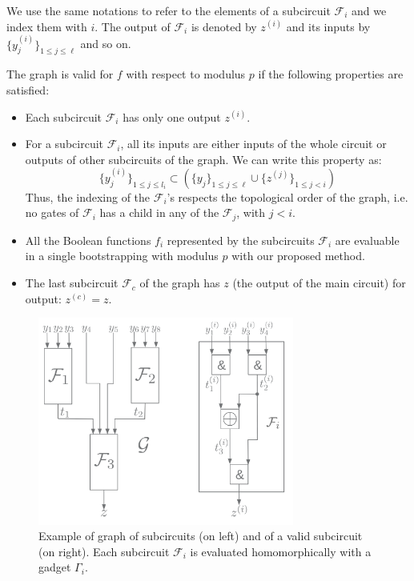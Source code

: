 We use the same notations to refer to the elements of a subcircuit $\mathcal{F}_i$ and we index them with $i$. The output of $\mathcal{F}_i$ is denoted by $z^{(i)}$ and its inputs by $\{y_j^{(i)}\}_{1 \le j \le \ell}$ and so on. 


The graph is valid for $f$ with respect to modulus $p$ if the following properties are satisfied:
\begin{itemize}
    \item Each subcircuit $\mathcal{F}_i$ has only one output $z^{(i)}$.
    \item For a subcircuit $\mathcal{F}_i$, all its inputs are either inputs of the whole circuit or outputs of other subcircuits of the graph. We can write this property as:
    $$
    \{y_j^{(i)}\}_{1 \le j \le l_i} \subset \left ( \{y_j\}_{1 \le j \le \ell} \cup \{z^{(j)}\}_{1 \le j < i} \right )
    $$
    Thus, the indexing of the $\mathcal{F}_i$'s respects the topological order of the graph, i.e. no gates of $\mathcal{F}_i$ has a child in any of the $\mathcal{F}_j$, with $j < i$.
    \item All the Boolean functions $f_i$ represented by the subcircuits $\mathcal{F}_i$ are evaluable in a single bootstrapping with modulus $p$ with our proposed method. 
    \item The last subcircuit $\mathcal{F}_c$ of the graph has $z$ (the output of the main circuit) for output: $z^{(c)} = z$.
\end{itemize}

\begin{figure}
    \centering
    \includegraphics[width=0.75\textwidth]{img/to_harmonize/graphs.png}
    \caption{Example of graph of subcircuits (on left) and of a valid subcircuit (on right). Each subcircuit $\mathcal{F}_i$ is evaluated homomorphically with a gadget $\Gamma_i$.}
    \label{fig:enter-label}
\end{figure}




